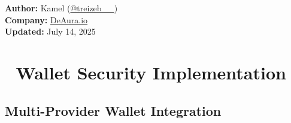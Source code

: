 \documentclass[11pt,a4paper]{article}
\begin{document}
\begin{titlepage}
    \vfill
    
    {\large\textbf{Author:} Kamel (\href{https://x.com/treizeb__}{@treizeb\_\_})\\
    \textbf{Company:} \href{https://deaura.io}{DeAura.io}\\
    \textbf{Updated:} July 14, 2025\par}
\end{titlepage}

\newpage
\tableofcontents
\newpage

\section{🔐 Wallet Security Implementation}

\subsection{Multi-Provider Wallet Integration}
\end{document}
